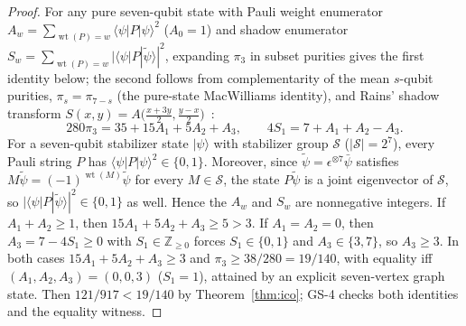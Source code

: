 \begin{proof}
For any pure seven-qubit state with Pauli weight enumerator $A_w=\sum_{\operatorname{wt}(P)=w}\langle\psi|P|\psi\rangle^2$ ($A_0=1$) and shadow enumerator $S_w=\sum_{\operatorname{wt}(P)=w}|\langle\psi|P|\tilde\psi\rangle|^2$, expanding $\pi_3$ in subset purities gives the first identity below; the second follows from complementarity of the mean $s$-qubit purities, $\pi_s=\pi_{7-s}$ (the pure-state MacWilliams identity), and Rains' shadow transform $S(x,y)=A\bigl(\tfrac{x+3y}2,\tfrac{y-x}2\bigr)$~\cite{Rains}:
\[
 280\pi_3=35+15A_1+5A_2+A_3,\qquad
 4S_1=7+A_1+A_2-A_3.
\]
For a seven-qubit stabilizer state $|\psi\rangle$ with stabilizer group $\mathcal S$ ($|\mathcal S|=2^7$), every Pauli string $P$ has $\langle\psi|P|\psi\rangle^2\in\{0,1\}$. Moreover, since $\tilde\psi=\epsilon^{\otimes 7}\bar\psi$ satisfies $M\tilde\psi=(-1)^{\operatorname{wt}(M)}\tilde\psi$ for every $M\in\mathcal S$, the state $P\tilde\psi$ is a joint eigenvector of $\mathcal S$, so $|\langle\psi|P|\tilde\psi\rangle|^2\in\{0,1\}$ as well. Hence the $A_w$ and $S_w$ are nonnegative integers. If $A_1+A_2\ge1$, then $15A_1+5A_2+A_3\ge5>3$. If $A_1=A_2=0$, then $A_3=7-4S_1\ge0$ with $S_1\in\mathbb Z_{\ge0}$ forces $S_1\in\{0,1\}$ and $A_3\in\{3,7\}$, so $A_3\ge3$. In both cases $15A_1+5A_2+A_3\ge3$ and $\pi_3\ge38/280=19/140$, with equality iff $(A_1,A_2,A_3)=(0,0,3)$ ($S_1=1$), attained by an explicit seven-vertex graph state. Then $121/917<19/140$ by Theorem~\ref{thm:ico}; GS-4 checks both identities and the equality witness. \qedhere
\end{proof}
